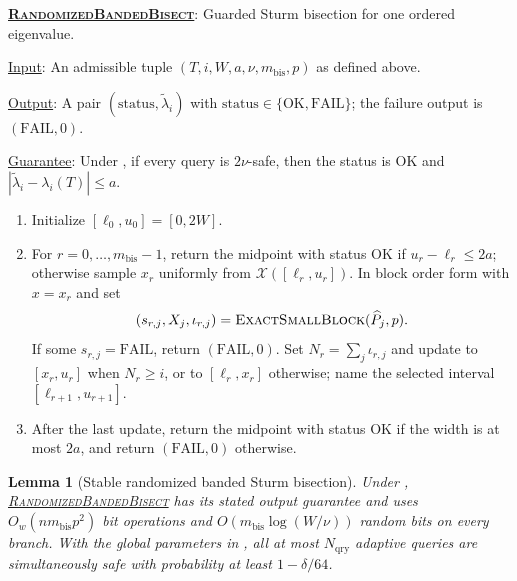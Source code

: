 \documentclass[11pt]{article}
\newenvironment{fminipage}%
  {\begin{Sbox}\begin{minipage}}%
  {\end{minipage}\end{Sbox}\fbox{\TheSbox}}
\newenvironment{algbox}[0]{%
\vskip 0.2in
\noindent
\begin{fminipage}{6.3in}
}{%
\end{fminipage}
\vskip 0.2in
}
\newtheorem{lemma}{Lemma}[section]
\newcommand{\RandomizedBandedBisect}{%
  \textnormal{\textsc{Randomized\hspace{0pt}Banded\hspace{0pt}Bisect}}}
\newcommand{\ExactSmallBlock}{%
  \textnormal{\textsc{Exact\hspace{0pt}Small\hspace{0pt}Block}}}
\begin{document}
\begin{algbox}
\textbf{\uline{\RandomizedBandedBisect}}: Guarded Sturm bisection for
one ordered eigenvalue.
\label{alg:banded-bisect}

\uline{Input}: An admissible tuple
$(T,i,W,a,\nu,m_{\mathrm{bis}},p)$ as defined above.

\uline{Output}: A pair $(\mathrm{status},\widetilde\lambda_i)$ with
$\mathrm{status}\in\{\mathrm{OK},\mathrm{FAIL}\}$; the failure output is
$(\mathrm{FAIL},0)$.

\uline{Guarantee}: Under , if every query is
$2\nu$-safe, then the status is $\mathrm{OK}$ and
$|\widetilde\lambda_i-\lambda_i(T)|\leq a$.

\begin{enumerate}
 \item Initialize $[\ell_0,u_0]=[0,2W]$.
 \item For $r=0,\ldots,m_{\mathrm{bis}}-1$, return the midpoint with status
 $\mathrm{OK}$ if $u_r-\ell_r\leq2a$; otherwise sample $x_r$ uniformly from
 $\mathcal X([\ell_r,u_r])$.  In block order form
  with $x=x_r$ and set
 \[
  (s_{r,j},X_j,\iota_{r,j})
   =\ExactSmallBlock(\widehat P_j,p).
 \]
 If some $s_{r,j}=\mathrm{FAIL}$, return $(\mathrm{FAIL},0)$.  Set
 $N_r=\sum_j\iota_{r,j}$ and update to $[x_r,u_r]$ when $N_r\geq i$, or to
 $[\ell_r,x_r]$ otherwise; name the selected interval
 $[\ell_{r+1},u_{r+1}]$.
 \item After the last update, return the midpoint with status $\mathrm{OK}$
 if the width is at most $2a$, and return $(\mathrm{FAIL},0)$ otherwise.
\end{enumerate}
\end{algbox}

\begin{lemma}[Stable randomized banded Sturm bisection]
\label{lem:banded-bisection}
Under ,
\hyperref[alg:banded-bisect]{\RandomizedBandedBisect} has its stated
output guarantee and uses
$O_w(nm_{\mathrm{bis}}p^2)$ bit operations and
$O(m_{\mathrm{bis}}\log(W/\nu))$ random bits on every branch.  With the
global parameters in , all
at most $N_{\mathrm{qry}}$ adaptive queries are simultaneously safe with
probability at least $1-\delta/64$.
\end{lemma}
\end{document}
